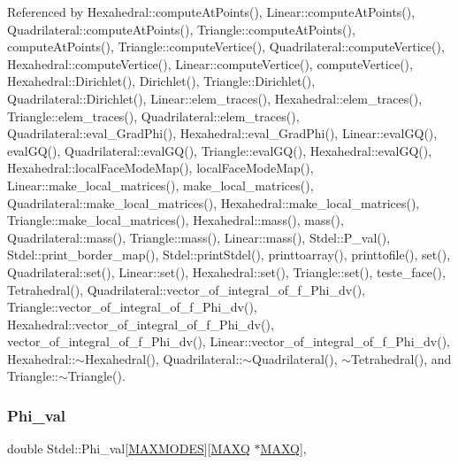 Referenced by Hexahedral\+::compute\+At\+Points(), Linear\+::compute\+At\+Points(), Quadrilateral\+::compute\+At\+Points(), Triangle\+::compute\+At\+Points(), compute\+At\+Points(), Triangle\+::compute\+Vertice(), Quadrilateral\+::compute\+Vertice(), Hexahedral\+::compute\+Vertice(), Linear\+::compute\+Vertice(), compute\+Vertice(), Hexahedral\+::\+Dirichlet(), Dirichlet(), Triangle\+::\+Dirichlet(), Quadrilateral\+::\+Dirichlet(), Linear\+::elem\+\_\+traces(), Hexahedral\+::elem\+\_\+traces(), Triangle\+::elem\+\_\+traces(), Quadrilateral\+::elem\+\_\+traces(), Quadrilateral\+::eval\+\_\+\+Grad\+Phi(), Hexahedral\+::eval\+\_\+\+Grad\+Phi(), Linear\+::eval\+G\+Q(), eval\+G\+Q(), Quadrilateral\+::eval\+G\+Q(), Triangle\+::eval\+G\+Q(), Hexahedral\+::eval\+G\+Q(), Hexahedral\+::local\+Face\+Mode\+Map(), local\+Face\+Mode\+Map(), Linear\+::make\+\_\+local\+\_\+matrices(), make\+\_\+local\+\_\+matrices(), Quadrilateral\+::make\+\_\+local\+\_\+matrices(), Hexahedral\+::make\+\_\+local\+\_\+matrices(), Triangle\+::make\+\_\+local\+\_\+matrices(), Hexahedral\+::mass(), mass(), Quadrilateral\+::mass(), Triangle\+::mass(), Linear\+::mass(), Stdel\+::\+P\+\_\+val(), Stdel\+::print\+\_\+border\+\_\+map(), Stdel\+::print\+Stdel(), printtoarray(), printtofile(), set(), Quadrilateral\+::set(), Linear\+::set(), Hexahedral\+::set(), Triangle\+::set(), teste\+\_\+face(), Tetrahedral(), Quadrilateral\+::vector\+\_\+of\+\_\+integral\+\_\+of\+\_\+f\+\_\+\+Phi\+\_\+dv(), Triangle\+::vector\+\_\+of\+\_\+integral\+\_\+of\+\_\+f\+\_\+\+Phi\+\_\+dv(), Hexahedral\+::vector\+\_\+of\+\_\+integral\+\_\+of\+\_\+f\+\_\+\+Phi\+\_\+dv(), vector\+\_\+of\+\_\+integral\+\_\+of\+\_\+f\+\_\+\+Phi\+\_\+dv(), Linear\+::vector\+\_\+of\+\_\+integral\+\_\+of\+\_\+f\+\_\+\+Phi\+\_\+dv(), Hexahedral\+::$\sim$\+Hexahedral(), Quadrilateral\+::$\sim$\+Quadrilateral(), $\sim$\+Tetrahedral(), and Triangle\+::$\sim$\+Triangle().

\mbox{\label{classStdel_ab7849f154bd766857aac9557c19f7f84}} 
\subsubsection{\texorpdfstring{Phi\+\_\+val}{Phi\_val}}
{\footnotesize\ttfamily double Stdel\+::\+Phi\+\_\+val\mbox{[}\hyperlink{MyOptions_8h_aa75ccd382acf88cec3e9c8025c1f88b7}{M\+A\+X\+M\+O\+D\+ES}\mbox{]}\mbox{[}\hyperlink{MyOptions_8h_af708e94d886ba3f59582612949cac702}{M\+A\+XQ} $\ast$\hyperlink{MyOptions_8h_af708e94d886ba3f59582612949cac702}{M\+A\+XQ}\mbox{]}\hspace{0.3cm}{\ttfamily [protected]}, {\ttfamily [inherited]}}



